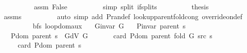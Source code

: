 \begin{isabellebody}
\ \ \ \ \ \ \ \ \isamarkupfalse%
\ assm\ False\isanewline
\ \ \ \ \ \ \ \ \isamarkupfalse%
\ {\isacharparenleft}{\kern0pt}simp\ split{\isacharcolon}{\kern0pt}\ if{\isacharunderscore}{\kern0pt}splits{\isacharparenleft}{\kern0pt}{}{\isacharparenright}{\kern0pt}{\isacharparenright}{\kern0pt}\isanewline
\ \ \ \ \ \ \isamarkupfalse%
\ \isamarkupfalse%
\ {\isacharquery}{\kern0pt}thesis\isanewline
\ \ \ \ \ \ \ \ \isamarkupfalse%
\ assms\isanewline
\ \ \ \ \ \ \ \ \isamarkupfalse%
\ {\isacharparenleft}{\kern0pt}auto\ simp\ add{\isacharcolon}{\kern0pt}\ P{\isachardot}{\kern0pt}ran{\isacharunderscore}{\kern0pt}def\ lookup{\isacharunderscore}{\kern0pt}parent{\isacharunderscore}{\kern0pt}fold{\isacharunderscore}{\kern0pt}cong{\isacharunderscore}{\kern0pt}{}\ override{\isacharunderscore}{\kern0pt}on{\isacharunderscore}{\kern0pt}def{\isacharparenright}{\kern0pt}\isanewline
\ \ \ \ \isamarkupfalse%
\isanewline
\ \ \isamarkupfalse%
\isanewline
{}\isamarkupfalse%
%
\endisatagproof
{\isafoldproof}%
%
\isadelimproof
%
\endisadelimproof
%
\isadelimdocument
%
\endisadelimdocument
%
\isatagdocument
%
\isamarkuptrue%
%
\isamarkuptrue%
%
\endisatagdocument
{\isafolddocument}%
%
\isadelimdocument
%
\endisadelimdocument
{}\isamarkupfalse%
\ {\isacharparenleft}{\kern0pt}\ bfs{\isacharparenright}{\kern0pt}\ loop{\isacharunderscore}{\kern0pt}dom{\isacharunderscore}{\kern0pt}aux{\isacharcolon}{\kern0pt}\isanewline
\ \ \ {\isachardoublequoteopen}G{\isachardot}{\kern0pt}invar\ G{\isachardoublequoteclose}\isanewline
\ \ \ {\isachardoublequoteopen}P{\isacharunderscore}{\kern0pt}invar\ {\isacharparenleft}{\kern0pt}parent\ s{\isacharparenright}{\kern0pt}{\isachardoublequoteclose}\isanewline
\ \ \ {\isachardoublequoteopen}P{\isachardot}{\kern0pt}dom\ {\isacharparenleft}{\kern0pt}parent\ s{\isacharparenright}{\kern0pt}\ {\isasymsubseteq}\ G{\isachardot}{\kern0pt}dV\ G{\isachardoublequoteclose}\isanewline
\ \ \isanewline
\ \ \ \ {\isachardoublequoteopen}card\ {\isacharparenleft}{\kern0pt}P{\isachardot}{\kern0pt}dom\ {\isacharparenleft}{\kern0pt}parent\ {\isacharparenleft}{\kern0pt}fold\ G\ src\ s{\isacharparenright}{\kern0pt}{\isacharparenright}{\kern0pt}{\isacharparenright}{\kern0pt}\ {\isacharequal}{\kern0pt}\isanewline
\ \ \ \ \ card\ {\isacharparenleft}{\kern0pt}P{\isachardot}{\kern0pt}dom\ {\isacharparenleft}{\kern0pt}parent\ s{\isacharparenright}{\kern0pt}{\isacharparenright}{\kern0pt}\ {\isacharplus}{\kern0pt}\isanewline

\end{isabellebody}
